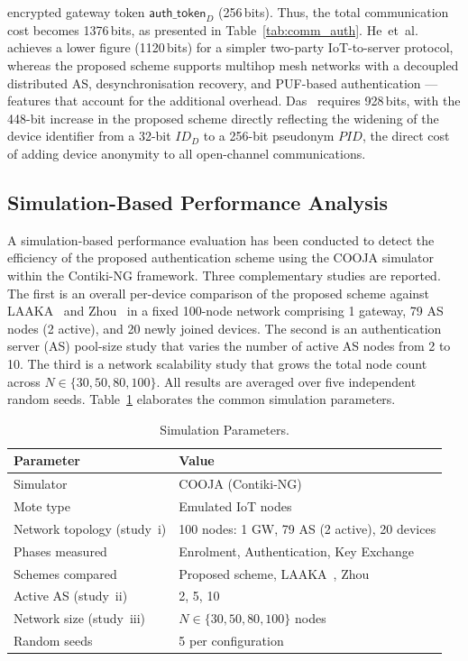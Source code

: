 \documentclass[conference]{IEEEtran}
\begin{document}
encrypted gateway token $\mathsf{auth\_token}_D$ (256\,bits). Thus, the total
communication cost becomes 1376\,bits, as presented in Table~\ref{tab:comm_auth}.
He~et~al.~\cite{he2023lightweight} achieves a lower figure (1120\,bits) for a simpler
two-party IoT-to-server protocol, whereas the proposed scheme supports multihop mesh
networks with a decoupled distributed AS, desynchronisation recovery, and PUF-based
authentication — features that account for the additional overhead.
Das~\cite{das2026comsnets} requires 928\,bits, with the 448-bit increase in the proposed
scheme directly reflecting the widening of the device identifier from a 32-bit $ID_D$ to
a 256-bit pseudonym $\mathit{PID}$, the direct cost of adding device anonymity to all
open-channel communications.




\subsection{Simulation-Based Performance Analysis}
\label{sec:sim}

A simulation-based performance evaluation has been conducted to detect the efficiency of
the proposed authentication scheme using the COOJA simulator within the Contiki-NG
framework. Three complementary studies are reported. The first is an overall per-device
comparison of the proposed scheme against LAAKA~\cite{ali2024laaka} and
Zhou~\cite{zhou2024auth} in a fixed 100-node network comprising 1 gateway, 79 AS nodes
(2 active), and 20 newly joined devices. The second is an authentication server (AS)
pool-size study that varies the number of active AS nodes from 2 to 10. The third is a
network scalability study that grows the total node count across $N \in \{30, 50, 80, 100\}$. All results are averaged over five independent
random seeds. Table~\ref{tab:simparams} elaborates the common simulation parameters.

\begin{table}[!t]
  \centering
  \caption{Simulation Parameters.}
  \label{tab:simparams}
  \scriptsize
  \setlength{\tabcolsep}{4pt}
  \begin{tabular}{ll}
    \toprule
    Parameter & Value \\
    \midrule
    Simulator          & COOJA (Contiki-NG) \\
    Mote type          & Emulated IoT nodes \\
    Network topology (study~i) & 100 nodes: 1 GW, 79 AS (2 active), 20 devices \\
    Phases measured    & Enrolment, Authentication, Key Exchange \\
    Schemes compared   & Proposed scheme, LAAKA~\cite{ali2024laaka}, Zhou~\cite{zhou2024auth} \\
    Active AS (study~ii) & 2, 5, 10 \\
    Network size (study~iii) & $N \in \{30, 50, 80, 100\}$ nodes \\
    Random seeds       & 5 per configuration \\
    \bottomrule
  \end{tabular}
\end{table}
\end{document}
